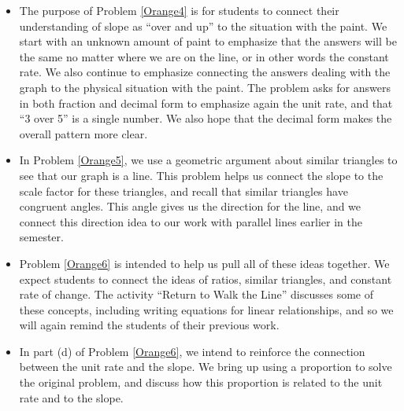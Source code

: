 \documentclass{ximera}
\begin{document}
\begin{instructorNotes}
\begin{itemize}
    \item The purpose of Problem \ref{Orange4} is for students to connect their understanding of slope as ``over and up'' to the situation with the paint.  We start with an unknown amount of paint to emphasize that the answers will be the same no matter where we are on the line, or in other words the constant rate.  We also continue to emphasize connecting the answers dealing with the graph to the physical situation with the paint.  The problem asks for answers in both fraction and decimal form to emphasize again the unit rate, and that ``3 over 5'' is a single number.  We also hope that the decimal form makes the overall pattern more clear.
    \item In Problem \ref{Orange5}, we use a geometric argument about similar triangles to see that our graph is a line.  This problem helps us connect the slope to the scale factor for these triangles, and recall that similar triangles have congruent angles.  This angle gives us the direction for the line, and we connect this direction idea to our work with parallel lines earlier in the semester.
    \item Problem \ref{Orange6} is intended to help us pull all of these ideas together.  We expect students to connect the ideas of ratios, similar triangles, and constant rate of change.  The activity ``Return to Walk the Line'' discusses some of these concepts, including writing equations for linear relationships, and so we will again remind the students of their previous work.
    \item In part (d) of Problem \ref{Orange6}, we intend to reinforce the connection between the unit rate and the slope. We bring up using a proportion to solve the original problem, and discuss how this proportion is related to the unit rate and to the slope.
\end{itemize}



\end{instructorNotes}
\end{document}
